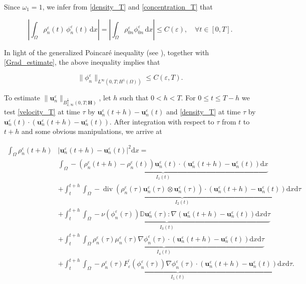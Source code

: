 \documentclass[11pt]{article}
\def\bq{\begin{equation}}
\def\eq{\end{equation}}
\def\bfH{\mathbf{H}}
\def\bfu{\mathbf{u}}
\def\md{\mathrm{d}}
\def\bq{\begin{equation}}
\def\eq{\end{equation}}
\def\Om{\Omega}
\begin{document}
{  %

Since $\omega_1 = 1$, we infer from \eqref{density_T} and \eqref{concentration_T} that

\[
\left| \int_{\Omega} \rho_n^{\varepsilon}(t)\,\phi_n^{\varepsilon}(t)\,\md x \right|
=
\left| \int_{\Omega} \rho_{0n}^{\varepsilon} \phi_{0n}^{\varepsilon} \, \md x \right|
\le
C(\varepsilon),\quad \forall t \in [0,T].
\]

In light of the generalized Poincaré inequality (see \cite[Chapter II, Section 1.4]{temam2012infinite}), together with \eqref{Grad_estimate}, the above inequality implies that

\bq
\|\phi_n^{\varepsilon}\|_{L^{\infty}(0,T;H^1({\Om}))} \le C(\varepsilon,T). \label{phi_time_infity}
\eq

}

To estimate $\|\bfu_n^{\varepsilon}\|_{B_{2,\infty}^{\frac{1}{4}}(0,T;\bfH)}$, let $h$ such that $0 <h< T$. For $0 \leq t \leq T - h$ we test \eqref{velocity_T} at time $\tau$ by $\bfu_n^{\varepsilon} (t+h) - \bfu_n^{\varepsilon} (t)$ and \eqref{density_T} at time $\tau$ by $\bfu_n^{\varepsilon}(t)\cdot(\bfu_n^{\varepsilon}(t+h) - \bfu_n^{\varepsilon} (t))$. After integration with
respect to $\tau$ from $t$ to $t+h$ and some obvious manipulations, we arrive at

\bq
\begin{aligned}\label{time_translation}
 \int_{\Omega} \rho_n^{\varepsilon}(t+h)&\left|\bfu_n^{\varepsilon}(t+h)-\bfu_n^{\varepsilon}(t)\right|^2 \md x
 =\\ 
&\underbrace{\int_{\Omega}-\left(\rho_n^{\varepsilon}(t+h)-\rho_n^{\varepsilon}(t)\right) \bfu_n^{\varepsilon}(t) \cdot\left(\bfu_n^{\varepsilon}(t+h)-\bfu_n^{\varepsilon}(t)\right) \mathrm{d} x}_{I_1(t)} \\
& +\underbrace{\int_t^{t+h} \int_{\Omega}-\operatorname{div}\left(\rho_n^{\varepsilon}(\tau) \bfu_n^{\varepsilon}(\tau) \otimes \bfu_n^{\varepsilon}(\tau)\right) \cdot\left(\bfu_n^{\varepsilon}(t+h)-\bfu_n^{\varepsilon}(t)\right) \mathrm{d} x \md \tau}_{I_2(t)} \\
& +\underbrace{\int_t^{t+h} \int_{\Omega}-\nu\left(\phi_n^{\varepsilon}(\tau)\right) \mathbb{D} \bfu_n^{\varepsilon}(\tau): \nabla\left(\bfu_n^{\varepsilon}(t+h)-\bfu_n^{\varepsilon}(t)\right) \mathrm{d} x \md \tau}_{I_3(t)} \\
& +\underbrace{\int_t^{t+h} \int_{\Omega} \rho_n^{\varepsilon}(\tau) \mu_n^{\varepsilon}(\tau) \nabla \phi_n^{\varepsilon}(\tau) \cdot\left(\bfu_n^{\varepsilon}(t+h)-\bfu_n^{\varepsilon}(t)\right) \mathrm{d} x \md \tau}_{I_4(t)} \\
& +\underbrace{\int_t^{t+h} \int_{\Omega}-\rho_n^{\varepsilon}(\tau) F_{\varepsilon}^{\prime}\left(\phi_n^{\varepsilon}(\tau)\right) \nabla \phi_n^{\varepsilon}(\tau) \cdot\left(\bfu_n^{\varepsilon}(t+h)-\bfu_n^{\varepsilon}(t)\right) \mathrm{d} x \md \tau}_{I_5(t)}. 
\end{aligned}
\eq
\end{document}
